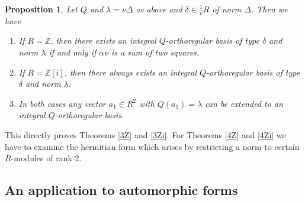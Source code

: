 \documentclass[11pt]{amsart}
\newtheorem{proposition}{Proposition}[section]
\theoremstyle{definition}
\theoremstyle{remark}
\begin{document}
\begin{proposition}\label{Orthoregbasisthm} 
Let $Q$ and $\lambda=\nu\Delta$ as above and $\delta\in\frac{1}{\nu} R$ of norm $\Delta$. Then we have
\begin{enumerate}
\item If $R=\mathbb Z$, then there exists an integral $Q$-orthoregular basis of type $\delta$ and norm $\lambda$ if and only if $\alpha\nu$ is a sum of two squares.
\item If $R=\mathbb Z[i]$, then there always exists an integral $Q$-orthoregular basis of type $\delta$ and norm $\lambda$.
\item In both cases any vector $a_1\in R^2$ with $Q(a_1)=\lambda$
can be extended to an integral $Q$-orthoregular basis.
\end{enumerate}
\end{proposition}

This directly proves Theorems \ref{3Z} and \ref{3Zi}. For Theorems \ref{4Z} and \ref{4Zi} we have to examine the hermitian form which arises by restricting a norm to certain $R$-modules of rank 2.

\subsection{An application to automorphic forms}
\end{document}
